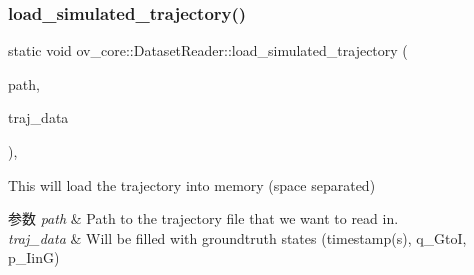\subsubsection{\texorpdfstring{load\+\_\+simulated\+\_\+trajectory()}{load\_simulated\_trajectory()}}
{\footnotesize\ttfamily static void ov\+\_\+core\+::\+Dataset\+Reader\+::load\+\_\+simulated\+\_\+trajectory (\begin{DoxyParamCaption}\item[{std\+::string}]{path,  }\item[{std\+::vector$<$ Eigen\+::\+Vector\+Xd $>$ \&}]{traj\+\_\+data }\end{DoxyParamCaption})\hspace{0.3cm}{\ttfamily [inline]}, {\ttfamily [static]}}



This will load the trajectory into memory (space separated) 


\begin{DoxyParams}{参数}
{\em path} & Path to the trajectory file that we want to read in. \\
\hline
{\em traj\+\_\+data} & Will be filled with groundtruth states (timestamp(s), q\+\_\+\+GtoI, p\+\_\+\+IinG) \\
\hline
\end{DoxyParams}
